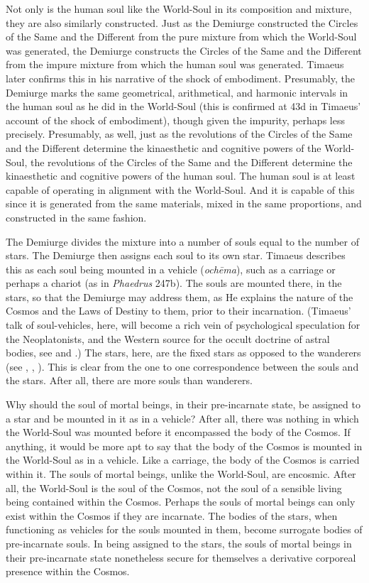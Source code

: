 Not only is the human soul like the World-Soul in its composition and mixture, they are also similarly constructed. Just as the Demiurge constructed the Circles of the Same and the Different from the pure mixture from which the World-Soul was generated, the Demiurge constructs the Circles of the Same and the Different from the impure mixture from which the human soul was generated. Timaeus later confirms this in his narrative of the shock of embodiment. Presumably, the Demiurge marks the same geometrical, arithmetical, and harmonic intervals in the human soul as he did in the World-Soul (this is confirmed at 43d in Timaeus' account of the shock of embodiment), though given the impurity, perhaps less precisely. Presumably, as well, just as the revolutions of the Circles of the Same and the Different determine the kinaesthetic and cognitive powers of the World-Soul, the revolutions of the Circles of the Same and the Different determine the kinaesthetic and cognitive powers of the human soul. The human soul is at least capable of operating in alignment with the World-Soul. And it is capable of this since it is generated from the same materials, mixed in the same proportions, and constructed in the same fashion.

The Demiurge divides the mixture into a number of souls equal to the number of stars. The Demiurge then assigns each soul to its own star. Timaeus describes this as each soul being mounted in a vehicle (\emph{ochēma}), such as a carriage or perhaps a chariot (as in \emph{Phaedrus} 247b). The souls are mounted there, in the stars, so that the Demiurge may address them, as He explains the nature of the Cosmos and the Laws of Destiny to them, prior to their incarnation. (Timaeus' talk of soul-vehicles, here, will become a rich vein of psychological speculation for the Neoplatonists, and the Western source for the occult doctrine of astral bodies, see \citealt[appendix 2]{Dodds:1963ul} and \citealt{Finamore:1985aa}.) The stars, here, are the fixed stars as opposed to the wanderers  (see \citealt[141--2 n13]{Archer-Hind:1888qd}, \citealt[255--6]{Taylor:1928qb}, \citealt[143]{Cornford:1935fk}). This is clear from the one to one correspondence between the souls and the stars. After all, there are more souls than wanderers.

Why should the soul of mortal beings, in their pre-incarnate state, be assigned to a star and be mounted in it as in a vehicle? After all, there was nothing in which the World-Soul was mounted before it encompassed the body of the Cosmos. If anything, it would be more apt to say that the body of the Cosmos is mounted in the World-Soul as in a vehicle. Like a carriage, the body of the Cosmos is carried within it. The souls of mortal beings, unlike the World-Soul, are encosmic. After all, the World-Soul is the soul of the Cosmos, not the soul of a sensible living being contained within the Cosmos. Perhaps the souls of mortal beings can only exist within the Cosmos if they are incarnate. The bodies of the stars, when functioning as vehicles for the souls mounted in them, become surrogate bodies of pre-incarnate souls. In being assigned to the stars, the souls of mortal beings in their pre-incarnate state nonetheless secure for themselves a derivative corporeal presence within the Cosmos. 

